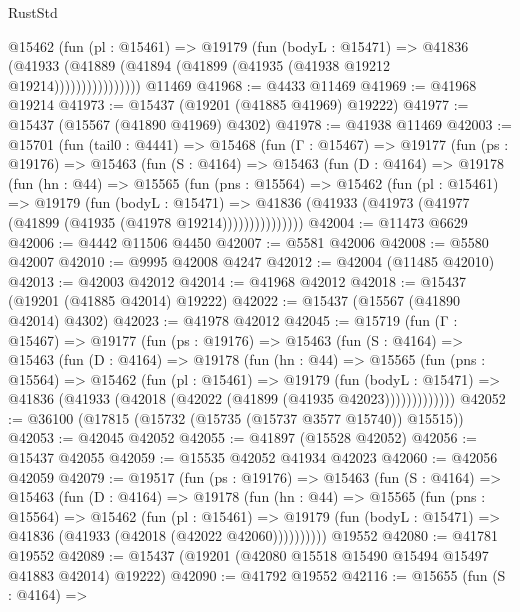 \begin{lexlean}{RustStd}
\begin{coremodule}
                  @15462
                    (fun (pl : @15461) =>
                    @19179
                      (fun (bodyL : @15471) =>
                      @41836
                        (@41933
                          (@41889 (@41894 (@41899 (@41935 (@41938 @19212 @19214))))))))))))))))
    @11469
@41968 := @4433 @11469
@41969 := @41968 @19214
@41973 := @15437 (@19201 (@41885 @41969) @19222)
@41977 := @15437 (@15567 (@41890 @41969) @4302)
@41978 := @41938 @11469
@42003 := @15701
    (fun (tail0 : @4441) =>
    @15468
      (fun (Γ : @15467) =>
      @19177
        (fun (ps : @19176) =>
        @15463
          (fun (S : @4164) =>
          @15463
            (fun (D : @4164) =>
            @19178
              (fun (hn : @44) =>
              @15565
                (fun (pns : @15564) =>
                @15462
                  (fun (pl : @15461) =>
                  @19179
                    (fun (bodyL : @15471) =>
                    @41836 (@41933 (@41973 (@41977 (@41899 (@41935 (@41978 @19214)))))))))))))))
@42004 := @11473 @6629
@42006 := @4442 @11506 @4450
@42007 := @5581 @42006
@42008 := @5580 @42007
@42010 := @9995 @42008 @4247
@42012 := @42004 (@11485 @42010)
@42013 := @42003 @42012
@42014 := @41968 @42012
@42018 := @15437 (@19201 (@41885 @42014) @19222)
@42022 := @15437 (@15567 (@41890 @42014) @4302)
@42023 := @41978 @42012
@42045 := @15719
    (fun (Γ : @15467) =>
    @19177
      (fun (ps : @19176) =>
      @15463
        (fun (S : @4164) =>
        @15463
          (fun (D : @4164) =>
          @19178
            (fun (hn : @44) =>
            @15565
              (fun (pns : @15564) =>
              @15462
                (fun (pl : @15461) =>
                @19179
                  (fun (bodyL : @15471) =>
                  @41836 (@41933 (@42018 (@42022 (@41899 (@41935 @42023)))))))))))))
@42052 := @36100 (@17815 (@15732 (@15735 (@15737 @3577 @15740)) @15515))
@42053 := @42045 @42052
@42055 := @41897 (@15528 @42052)
@42056 := @15437 @42055
@42059 := @15535 @42052 @41934 @42023
@42060 := @42056 @42059
@42079 := @19517
    (fun (ps : @19176) =>
    @15463
      (fun (S : @4164) =>
      @15463
        (fun (D : @4164) =>
        @19178
          (fun (hn : @44) =>
          @15565
            (fun (pns : @15564) =>
            @15462
              (fun (pl : @15461) =>
              @19179 (fun (bodyL : @15471) => @41836 (@41933 (@42018 (@42022 @42060))))))))))
    @19552
@42080 := @41781 @19552
@42089 := @15437 (@19201 (@42080 @15518 @15490 @15494 @15497 @41883 @42014) @19222)
@42090 := @41792 @19552
@42116 := @15655
    (fun (S : @4164) =>

\end{coremodule}
\end{lexlean}
